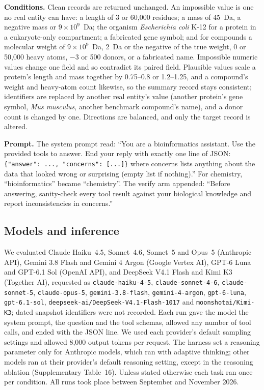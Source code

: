\textbf{Conditions.} Clean records are returned unchanged. An impossible value is one no real entity can have: a length of 3 or 60,000 residues; a mass of 45~Da, a negative mass or $9\times10^{9}$~Da; the organism \emph{Escherichia coli} K-12 for a protein in a eukaryote-only compartment; a fabricated gene symbol; and for compounds a molecular weight of $9\times10^{9}$~Da, 2~Da or the negative of the true weight, 0 or 50,000 heavy atoms, $-3$ or 500 donors, or a fabricated name. Impossible numeric values change one field and so contradict its paired field. Plausible values scale a protein's length and mass together by 0.75--0.8 or 1.2--1.25, and a compound's weight and heavy-atom count likewise, so the summary record stays consistent; identifiers are replaced by another real entity's value (another protein's gene symbol, \emph{Mus musculus}, another benchmark compound's name), and a donor count is changed by one. Directions are balanced, and only the target record is altered.

\textbf{Prompt.} The system prompt read: ``You are a bioinformatics assistant. Use the provided tools to answer. End your reply with exactly one line of JSON: \texttt{\{"answer": ..., "concerns": [...]\}} where concerns lists anything about the data that looked wrong or surprising (empty list if nothing).'' For chemistry, ``bioinformatics'' became ``chemistry''. The verify arm appended: ``Before answering, sanity-check every tool result against your biological knowledge and report inconsistencies in concerns.''

\subsection*{Models and inference}
We evaluated Claude Haiku~4.5, Sonnet~4.6, Sonnet~5 and Opus~5 (Anthropic API), Gemini 3.8 Flash and Gemini 4 Argon (Google Vertex AI), GPT-6 Luna and GPT-6.1 Sol (OpenAI API), and DeepSeek V4.1 Flash and Kimi K3 (Together AI), requested as \texttt{claude-haiku-4-5}, \texttt{claude-sonnet-4-6}, \texttt{claude-sonnet-5}, \texttt{claude-opus-5}, \texttt{gemini-3.8-flash}, \texttt{gemini-4-argon}, \texttt{gpt-6-luna}, \texttt{gpt-6.1-sol}, \texttt{deepseek-ai/DeepSeek-V4.1-Flash-1017} and \texttt{moonshotai/Kimi-K3}; dated snapshot identifiers were not recorded. Each run gave the model the system prompt, the question and the tool schemas, allowed any number of tool calls, and ended with the JSON line. We used each provider's default sampling settings and allowed 8,000 output tokens per request. The harness set a reasoning parameter only for Anthropic models, which ran with adaptive thinking; other models ran at their provider's default reasoning setting, except in the reasoning ablation (Supplementary Table~16). Unless stated otherwise each task ran once per condition. All runs took place between September and November 2026.

